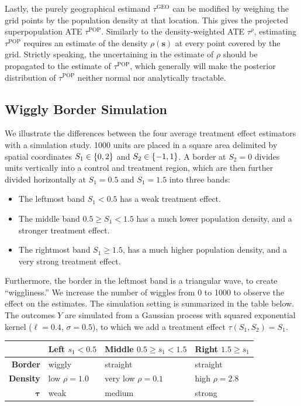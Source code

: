 \documentclass[letter]{article}
\providecommand{\tightlist}{%
      \setlength{\itemsep}{0pt}\setlength{\parskip}{0pt}}
\newcommand{\svec}{\mathbold{s}}
\newcommand{\taurho}{\tau^{\rho}}
\newcommand{\taugeo}{\tau^{\mathrm{GEO}}}
\newcommand{\taupop}{\tau^{\mathrm{POP}}}
\newcommand{\taubold}{\bm{\tau}}
\providecommand{\tightlist}{%
  	  \setlength{\itemsep}{0pt}\setlength{\parskip}{0pt}}
\begin{document}
Lastly, the purely geographical estimand \(\taugeo\) can be modified by weighing the grid points by the population density at that location.
This gives the projected superpopulation ATE \(\taupop\).
Similarly to the density-weighted ATE \(\taurho\), estimating \(\taupop\) requires an estimate of the density \(\rho(\svec)\) at every point covered by the grid.
Strictly speaking, the uncertaining in the estimate of \(\rho\) should be propagated to the estimate of \(\taupop\), which generally will make the posterior distribution of \(\taupop\) neither normal nor analytically tractable.
    


    	\subsection{Wiggly Border Simulation}\label{wiggly-border-simulation}

We illustrate the differences between the four average treatment effect estimators with a simulation study.
1000 units are placed in a square area delimited by spatial coordinates \(S_1 \in \cbr{0,2}\) and \(S_2 \in \cbr{-1, 1}\).
A border at \(S_2=0\) divides units vertically into a control and treatment region,
which are then further divided horizontally at \(S_1=0.5\) and \(S_1=1.5\) into three bands:

\begin{itemize}
\tightlist
\item
  The leftmost band \(S_1 < 0.5\) has a weak treatment effect.
\item
  The middle band \(0.5 \ge S_1 < 1.5\) has a much lower population density, and a stronger treatment effect.
\item
  The rightmost band \(S_1 \ge 1.5\), has a much higher population density, and a very strong treatment effect.
\end{itemize}

Furthermore, the border in the leftmost band is a triangular wave, to create ``wiggliness.''
We increase the number of wiggles from 0 to 1000 to observe the effect on the estimates.
The simulation setting is summarized in the table below.
The outcomes \(Y\) are simulated from a Gaussian process with squared exponential kernel
(\(\ell=0.4\), \(\sigma=0.5\)), to which we add a treatment effect \(\tau(S_1, S_2) = S_1\).
    


    	\begin{longtable}[]{@{}rlll@{}}
\toprule
& Left \(s_1< 0.5\) & Middle \(0.5 \ge s_1 < 1.5\) & Right \(1.5 \ge s_1\)\tabularnewline
\midrule
\endhead
\textbf{Border} & wiggly & straight & straight\tabularnewline
\textbf{Density} & low \(\rho=1.0\) & very low \(\rho=0.1\) & high \(\rho=2.8\)\tabularnewline
\(\taubold\) & weak & medium & strong\tabularnewline
\bottomrule
\end{longtable}
    
\end{document}
